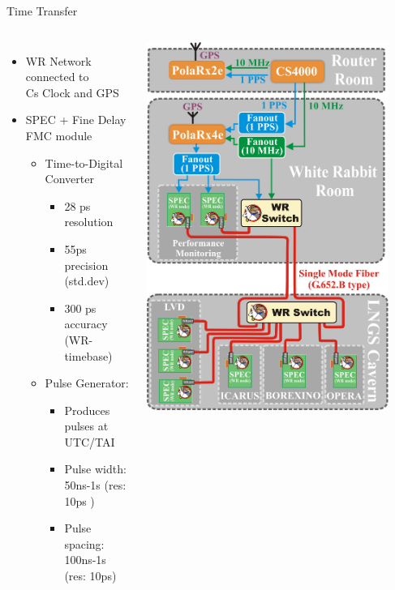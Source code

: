 \documentclass[compress,red]{beamer}
\begin{document}
\begin{frame}{Time Transfer}
  \begin{columns}[c]
      \begin{itemize}
	\item WR Network connected to \\ Cs Clock and GPS
	\item SPEC + Fine Delay FMC module
	\begin{itemize}
	  \item Time-to-Digital Converter
	  \begin{itemize}
	    \item 28 ps resolution
	    \item 55ps precision (std.dev)
	    \item 300 ps accuracy (WR-timebase)
	  \end{itemize}
	  \item Pulse Generator:
	  \begin{itemize}
	    \item Produces pulses at UTC/TAI
	    \item Pulse width: 50ns-1s (res: 10ps )
	    \item Pulse spacing: 100ns-1s (res: 10ps)
	  \end{itemize}
	\end{itemize}
      \end{itemize}
      \begin{center}
	\includegraphics[width=0.9\textwidth]{applications/CNGS2.pdf}

\end{center}
\end{columns}
\end{frame}
\end{document}
